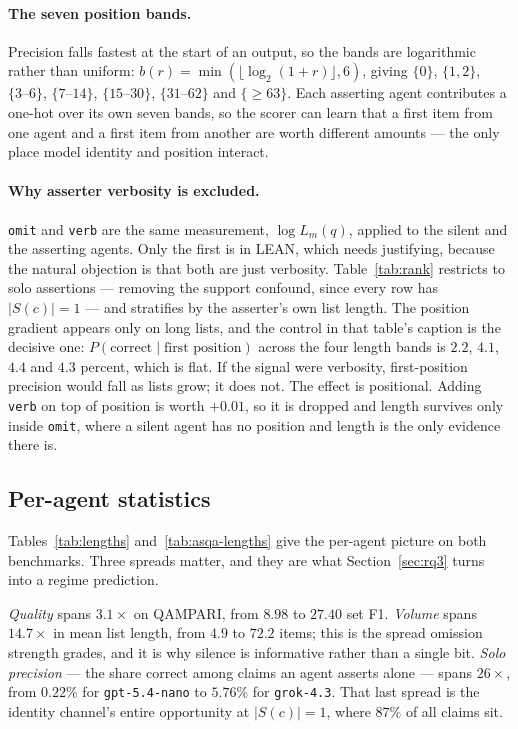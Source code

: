 \documentclass{article}
\begin{document}
\paragraph{The seven position bands.}
Precision falls fastest at the start of an output, so the bands are logarithmic rather than uniform: $b(r) = \min(\lfloor \log_2 (1+r) \rfloor, 6)$, giving $\{0\}$, $\{1,2\}$, $\{3\text{--}6\}$, $\{7\text{--}14\}$, $\{15\text{--}30\}$, $\{31\text{--}62\}$ and $\{\geq 63\}$. Each asserting agent contributes a one-hot over its own seven bands, so the scorer can learn that a first item from one agent and a first item from another are worth different amounts --- the only place model identity and position interact.

\paragraph{Why asserter verbosity is excluded.}
\texttt{omit} and \texttt{verb} are the same measurement, $\log L_m(q)$, applied to the silent and the asserting agents. Only the first is in LEAN, which needs justifying, because the natural objection is that both are just verbosity. Table~\ref{tab:rank} restricts to solo assertions --- removing the support confound, since every row has $|S(c)|=1$ --- and stratifies by the asserter's own list length. The position gradient appears only on long lists, and the control in that table's caption is the decisive one: $P(\mathrm{correct} \mid \text{first position})$ across the four length bands is $2.2$, $4.1$, $4.4$ and $4.3$ percent, which is flat. If the signal were verbosity, first-position precision would fall as lists grow; it does not. The effect is positional. Adding \texttt{verb} on top of position is worth $+0.01$, so it is dropped and length survives only inside \texttt{omit}, where a silent agent has no position and length is the only evidence there is.

\subsection{Per-agent statistics}
\label{app:agents}

Tables~\ref{tab:lengths} and~\ref{tab:asqa-lengths} give the per-agent picture on both benchmarks. Three spreads matter, and they are what Section~\ref{sec:rq3} turns into a regime prediction.

\emph{Quality} spans $3.1\times$ on QAMPARI, from $8.98$ to $27.40$ set F1. \emph{Volume} spans $14.7\times$ in mean list length, from $4.9$ to $72.2$ items; this is the spread omission strength grades, and it is why silence is informative rather than a single bit. \emph{Solo precision} --- the share correct among claims an agent asserts alone --- spans $26\times$, from $0.22\%$ for \texttt{gpt-5.4-nano} to $5.76\%$ for \texttt{grok-4.3}. That last spread is the identity channel's entire opportunity at $|S(c)|=1$, where $87\%$ of all claims sit.
\end{document}
